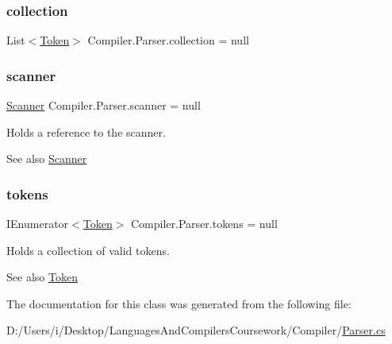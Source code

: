 \subsubsection{\texorpdfstring{collection}{collection}}
{\footnotesize\ttfamily List$<$\mbox{\hyperlink{class_compiler_1_1_token}{Token}}$>$ Compiler.\+Parser.\+collection = null\hspace{0.3cm}{\ttfamily [private]}}

\mbox{\label{class_compiler_1_1_parser_a022d273a476d1ce6198f601275fa9a15}} 
\subsubsection{\texorpdfstring{scanner}{scanner}}
{\footnotesize\ttfamily \mbox{\hyperlink{class_compiler_1_1_scanner}{Scanner}} Compiler.\+Parser.\+scanner = null\hspace{0.3cm}{\ttfamily [private]}}

Holds a reference to the scanner. \begin{DoxySeeAlso}{See also}
\mbox{\hyperlink{class_compiler_1_1_scanner}{Scanner}} 
\end{DoxySeeAlso}
\mbox{\label{class_compiler_1_1_parser_a4db075175c853a197c7b8db7d787a0a5}} 
\subsubsection{\texorpdfstring{tokens}{tokens}}
{\footnotesize\ttfamily I\+Enumerator$<$\mbox{\hyperlink{class_compiler_1_1_token}{Token}}$>$ Compiler.\+Parser.\+tokens = null\hspace{0.3cm}{\ttfamily [private]}}

Holds a collection of valid tokens. \begin{DoxySeeAlso}{See also}
\mbox{\hyperlink{class_compiler_1_1_token}{Token}} 
\end{DoxySeeAlso}


The documentation for this class was generated from the following file\+:\begin{DoxyCompactItemize}
\item 
D\+:/\+Users/i/\+Desktop/\+Languages\+And\+Compilers\+Coursework/\+Compiler/\mbox{\hyperlink{_parser_8cs}{Parser.\+cs}}\end{DoxyCompactItemize}

